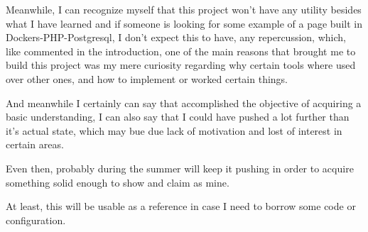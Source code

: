 \begin{flushleft}
    Meanwhile, I can recognize myself that this project won't have any utility besides what I have learned and if
    someone is looking for some example of a page built in Dockers-PHP-Postgresql, I don't expect this to have,
    any repercussion, which, like commented in the introduction, one of the main reasons that brought me to build this
    project was my mere curiosity regarding why certain tools where used over other ones, and how to implement or worked
    certain things.
\end{flushleft}
\begin{flushleft}
    And meanwhile I certainly can say that accomplished the objective of acquiring a basic understanding, I can also say
    that I could have pushed a lot further than it's actual state, which may bue due lack of motivation and lost of
    interest in certain areas.
\end{flushleft}
\begin{flushleft}
    Even then, probably during the summer will keep it pushing in order to acquire something solid enough to show and
    claim as mine.
\end{flushleft}
\begin{flushleft}
    At least, this will be usable as a reference in case I need to borrow some code or configuration.
\end{flushleft}